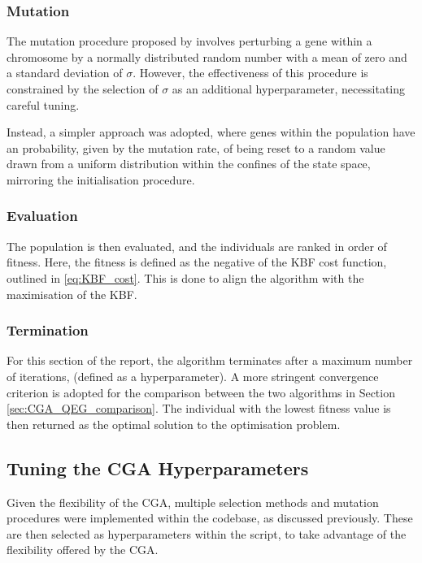 \documentclass[10pt]{article}
\begin{document}
\begin{multicols}{2}
\subsubsection{Mutation}

The mutation procedure proposed by \cite{PGA} involves perturbing a gene within a chromosome by a normally distributed random number with a mean of zero and a standard deviation of $\sigma$. However, the effectiveness of this procedure is constrained by the selection of $\sigma$ as an additional hyperparameter, necessitating careful tuning. 

Instead, a simpler approach was adopted, where genes within the population have an probability, given by the mutation rate, of being reset to a random value drawn from a uniform distribution within the confines of the state space, mirroring the initialisation procedure.

\subsubsection{Evaluation}

The population is then evaluated, and the individuals are ranked in order of fitness. Here, the fitness is defined as the negative of the KBF cost function, outlined in \ref{eq:KBF_cost}. This is done to align the algorithm with the maximisation of the KBF.

\subsubsection{Termination}

For this section of the report, the algorithm terminates after a maximum number of iterations, (defined as a hyperparameter). A more stringent convergence criterion is adopted for the comparison between the two algorithms in Section \ref{sec:CGA_QEG_comparison}. The individual with the lowest fitness value is then returned as the optimal solution to the optimisation problem.

\subsection{Tuning the CGA Hyperparameters}
\label{sec:CGA_selection_mutation}

Given the flexibility of the CGA, multiple selection methods and mutation procedures were implemented within the codebase, as discussed previously. These are then selected as hyperparameters within the script, %
to take advantage of the flexibility offered by the CGA. 


\end{multicols}
\end{document}
